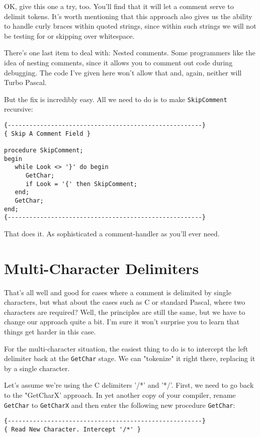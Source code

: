 {{OK, give this one a try, too. You'll  find  that  it will let a comment serve to delimit tokens. It's worth mentioning that this approach also gives us the  ability to handle curly braces within quoted strings, since within such  strings we will not be testing for or skipping over whitespace.

There's one last  item  to  deal  with:  Nested  comments. Some programmers like the idea  of  nesting  comments, since it allows you to comment out code during debugging. The  code  I've  given here won't allow that and, again, neither will Turbo Pascal.

But the fix is incredibly easy. All  we  need  to  do is to make {\tt SkipComment} recursive:

\begin{verbatim}
{------------------------------------------------------}
{ Skip A Comment Field }

procedure SkipComment;
begin
   while Look <> '}' do begin
      GetChar;
      if Look = '{' then SkipComment;
   end;
   GetChar;
end;
{------------------------------------------------------}
\end{verbatim}

That does it. As  sophisticated a comment-handler as you'll ever need.

\section{Multi-Character Delimiters}

That's all well and  good  for cases where a comment is delimited by single  characters, but  what  about  the  cases such as C or standard Pascal, where two  characters  are  required?  Well, the principles are still the same, but we have to change our approach quite a bit. I'm sure it won't surprise you to learn that things get harder in this case.

For the multi-character situation, the  easiest thing to do is to intercept the left delimiter  back  at the {\tt GetChar} stage. We can "tokenize" it right there, replacing it by a single character.

Let's assume we're using the C delimiters '/*' and '*/'. First, we  need  to  go back to the "GetCharX' approach. In yet another copy of your compiler, rename  {\tt GetChar} to {\tt GetCharX} and then enter the following new procedure {\tt GetChar}:

\begin{verbatim}
{------------------------------------------------------}
{ Read New Character. Intercept '/*' }


\end{verbatim}}}
